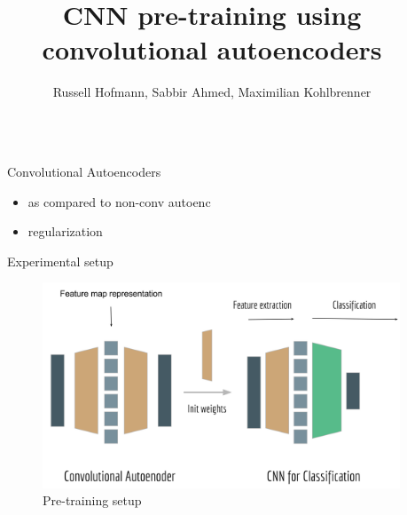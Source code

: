 \documentclass[final]{beamer}
\title{CNN pre-training using convolutional autoencoders} %
\author{Russell Hofmann, Sabbir Ahmed, Maximilian Kohlbrenner } %
\institute{TU Berlin} %
\newlength{\sepwid}
\newlength{\onecolwid}
\begin{document}

\setlength{\belowcaptionskip}{2ex} %
\setlength\belowdisplayshortskip{2ex} %

\begin{frame}[t] %

\begin{columns}[t] %

\begin{column}{\sepwid}\end{column} %

\begin{column}{\onecolwid} %


\begin{block}{Convolutional Autoencoders}

\begin{itemize}
	\item as compared to non-conv autoenc
	\item regularization
\end{itemize}

\end{block}


\begin{block}{Experimental setup}

\begin{figure}
\includegraphics[width=\linewidth]{graphics/setup.png}
\caption{Pre-training setup}
\end{figure}


\end{block}
\end{column}
\end{columns}
\end{frame}
\end{document}
